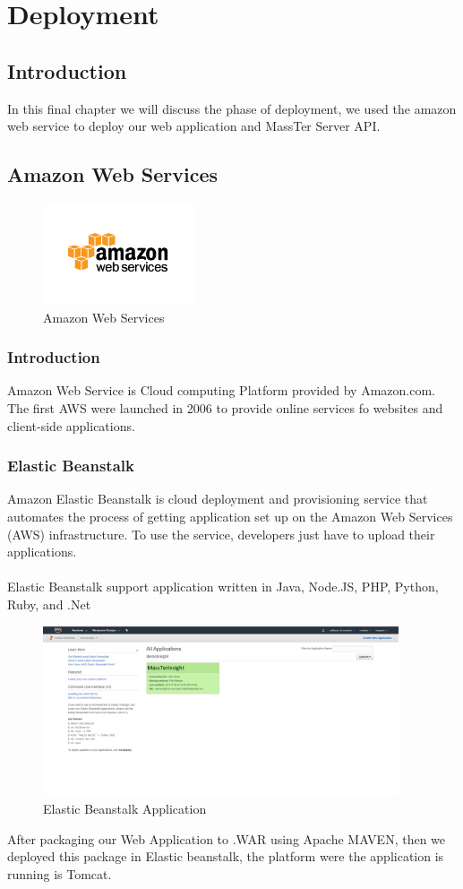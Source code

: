 \chapter{Deployment}

	\section{Introduction}
	In this final chapter we will discuss the phase of deployment, we used the amazon web service to deploy our web application and MassTer Server API.
	\section{Amazon Web Services}
	\begin{figure}[h]
		\centering
		\includegraphics[width=0.4\textwidth]{aws-logo.png}
		\caption{Amazon Web Services}
	\end{figure}
	\subsection{Introduction}
	Amazon Web Service is Cloud computing Platform provided by Amazon.com. The first AWS were launched in 2006 to provide online services fo websites and client-side applications.
	\clearpage
	\newpage
	\subsection{Elastic Beanstalk}
	Amazon Elastic Beanstalk is cloud deployment and provisioning service that automates the process of getting application set up on the Amazon Web Services (AWS) infrastructure. To use the service, developers just have to upload their applications.
	\\
	\\
	Elastic Beanstalk support application written in Java, Node.JS, PHP, Python, Ruby, and .Net
	 \pagebreak
	\clearpage
	\newpage
	\begin{figure}[h]
		\centering
		\includegraphics[angle=90,width=10.5cm]{ElasticBeanstalkApplication.png}
		\caption{Elastic Beanstalk Application}	
	\end{figure}
 \pagebreak
\clearpage
\newpage
After packaging our Web Application to .WAR using Apache MAVEN, then we deployed this package in Elastic beanstalk, the platform were the application is running is Tomcat.

